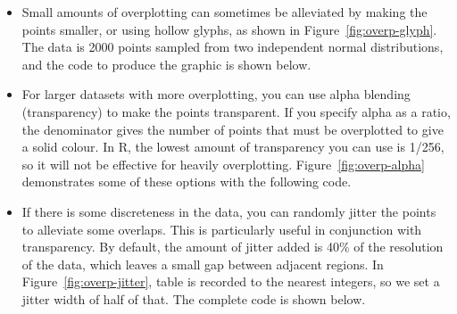 \begin{itemize}

  \item Small amounts of overplotting can sometimes be alleviated by making the points smaller, or using hollow glyphs, as shown in Figure~\ref{fig:overp-glyph}. The data is 2000 points sampled from two independent normal distributions, and the code to produce the graphic is shown below.

    
  
  \item For larger datasets with more overplotting, you can use alpha blending (transparency) to make the points transparent.  If you specify alpha as a ratio, the denominator gives the number of points that must be overplotted to give a solid colour.  In R, the lowest amount of transparency you can use is 1/256, so it will not be effective for heavily overplotting.  Figure~\ref{fig:overp-alpha} demonstrates some of these options with the following code.
    
    

  \item If there is some discreteness in the data, you can randomly jitter the points to alleviate some overlaps.  This is particularly useful in conjunction with transparency.  By default, the amount of jitter added is 40\% of the resolution of the data, which leaves a small gap between adjacent regions. In Figure~\ref{fig:overp-jitter}, table is recorded to the nearest integers, so we set a jitter width of half of that.  The complete code is shown below.
  

\end{itemize}
